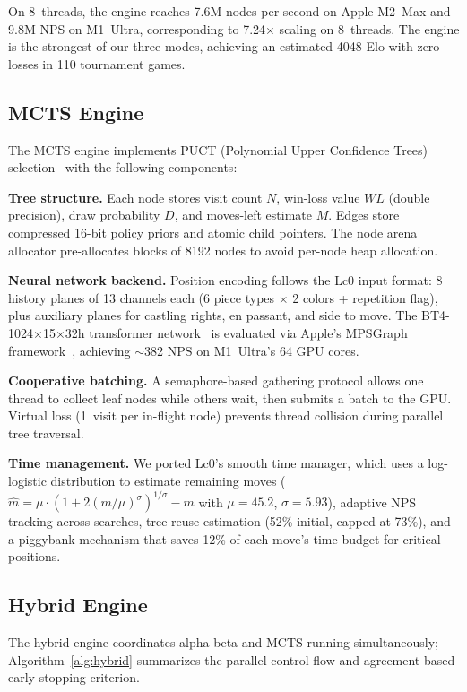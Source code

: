 \documentclass{svproc}
\begin{document}
On 8~threads, the engine reaches 7.6M nodes per second on Apple M2~Max and 9.8M NPS on M1~Ultra, corresponding to 7.24$\times$ scaling on 8~threads. The engine is the strongest of our three modes, achieving an estimated 4048 Elo with zero losses in 110 tournament games.

\subsection{MCTS Engine}
\label{sec:arch-mcts}

The MCTS engine implements PUCT (Polynomial Upper Confidence Trees) selection~\cite{rosin2011multi} with the following components:

\textbf{Tree structure.} Each node stores visit count $N$, win-loss value $W\!L$ (double precision), draw probability $D$, and moves-left estimate $M$. Edges store compressed 16-bit policy priors and atomic child pointers. The node arena allocator pre-allocates blocks of 8192 nodes to avoid per-node heap allocation.

\textbf{Neural network backend.} Position encoding follows the Lc0 input format: 8 history planes of 13 channels each (6 piece types $\times$ 2 colors + repetition flag), plus auxiliary planes for castling rights, en passant, and side to move. The BT4-1024$\times$15$\times$32h transformer network~\cite{lc0} is evaluated via Apple's MPSGraph framework~\cite{apple2022metal}, achieving $\sim$382 NPS on M1~Ultra's 64 GPU cores.

\textbf{Cooperative batching.} A semaphore-based gathering protocol allows one thread to collect leaf nodes while others wait, then submits a batch to the GPU. Virtual loss (1~visit per in-flight node) prevents thread collision during parallel tree traversal.

\textbf{Time management.} We ported Lc0's smooth time manager, which uses a log-logistic distribution to estimate remaining moves ($\hat{m} = \mu \cdot (1 + 2(m/\mu)^\sigma)^{1/\sigma} - m$ with $\mu=45.2$, $\sigma=5.93$), adaptive NPS tracking across searches, tree reuse estimation (52\% initial, capped at 73\%), and a piggybank mechanism that saves 12\% of each move's time budget for critical positions.

\subsection{Hybrid Engine}
\label{sec:arch-hybrid}

The hybrid engine coordinates alpha-beta and MCTS running simultaneously; Algorithm~\ref{alg:hybrid} summarizes the parallel control flow and agreement-based early stopping criterion.
\end{document}
